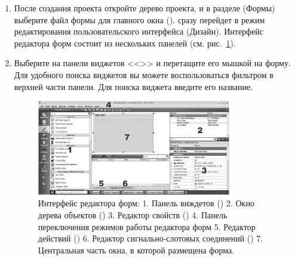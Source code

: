 \begin{enumerate}
\item После создания проекта откройте дерево проекта, и в разделе (Формы) выберите файл формы для главного окна
().  сразу перейдет в режим редактирования пользовательского интерфейса
(Дизайн). Интерфейс редактора форм состоит из нескольких панелей (см. рис.~\ref{ch15:refDrawing1}).
\item Выберите на панели виджетов <<>> и перетащите его мышкой на
форму. Для удобного поиска виджетов вы можете воспользоваться фильтром в верхней части панели. Для поиска виджета
введите его название.
\begin{figure}[htb]
\begin{center}
\includegraphics[width=0.8\textwidth]{img/ris_15_2}
\caption[Интерфейс редактора форм.]{Интерфейс редактора форм: 
1. Панель виждетов () 
2. Окно дерева объектов ()
3. Редактор свойств () 
4. Панель переключения режимов работы редактора форм 
5. Редактор действий () 
6. Редактор сигнально-слотовых соединений () 
7. Центральная часть окна, в которой размещена форма.}
\label{ch15:refDrawing1}
\end{center}
\end{figure}


\end{enumerate}
